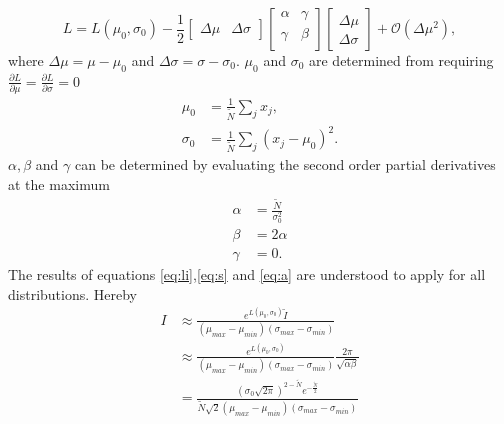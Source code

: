 \begin{example}
	\begin{equation}
		L = L(\mu_0,\sigma_0)-\frac{1}{2}\begin{bmatrix}
			\Delta\mu & \Delta\sigma
		\end{bmatrix}
		\begin{bmatrix}
			\alpha & \gamma\\
			\gamma & \beta \\
		\end{bmatrix}\begin{bmatrix}
			\Delta\mu\\ \Delta\sigma
		\end{bmatrix}
		+\mathcal{O}(\Delta\mu^2),
		\label{eq:li}
	\end{equation}
	where $\Delta \mu = \mu-\mu_0$ and $\Delta\sigma = \sigma-\sigma_0$. $\mu_0$ and $\sigma_0$ are determined from requiring $\frac{\partial L}{\partial \mu}=\frac{\partial L}{\partial \sigma}=0$
	\begin{equation}
		\begin{split}
			\mu_0 &= \frac{1}{\tilde{N}}\sum_{j}x_j,\\
			\sigma_0 &= \frac{1}{\tilde{N}}\sum_j(x_j-\mu_0)^2.
		\end{split}
		\label{eq:s}	
	\end{equation}
	$\alpha,\beta$ and $\gamma$ can be determined by evaluating the second order partial derivatives at the maximum
	\begin{equation}
		\begin{split}
			\alpha & = \frac{\tilde{N}}{\sigma_0^2}\\
			\beta & = 2\alpha\\
			\gamma & = 0.
		\end{split}
		\label{eq:a}
	\end{equation} 
	The results of equations \eqref{eq:li},\eqref{eq:s} and \eqref{eq:a} are understood to apply for all distributions.
	Hereby
	\begin{equation}
		\begin{split}
			I &\approx \frac{e^{L(\mu_0,\sigma_0)}\tilde{I}}{(\mu_{max}-\mu_{min})(\sigma_{max}-\sigma_{min})} \\
			&\approx \frac{e^{L(\mu_0,\sigma_0)}}{(\mu_{max}-\mu_{min})(\sigma_{max}-\sigma_{min})}\frac{2\pi}{\sqrt{\alpha\beta}}\\
			&=\frac{(\sigma_0 \sqrt{2\pi})^{2-\tilde{N}}e^{-\frac{\tilde{N}}{2}}}{\tilde{N}\sqrt{2}(\mu_{max}-\mu_{min})(\sigma_{max}-\sigma_{min})}
		\end{split}
	\end{equation}

\end{example}
